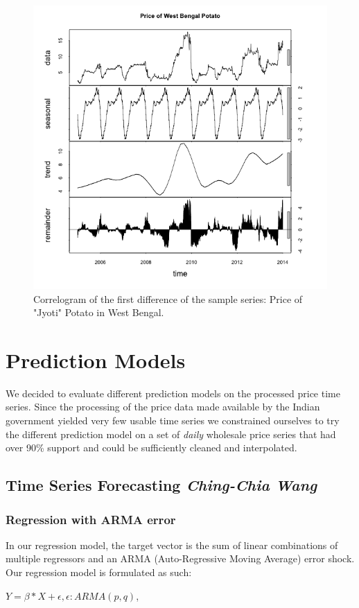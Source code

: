 \begin{figure}
    \centering
    \includegraphics[width=.7\textwidth]{./img/seasonal.png}
    \caption{Correlogram of the first difference of the sample series: Price of "Jyoti" Potato in West Bengal.}
\end{figure}


\section*{Prediction Models}
We decided to evaluate different prediction models on the processed price time series. Since the processing of the price data made available by the Indian government yielded very few usable time series we constrained ourselves to try the different prediction model on a set of \emph{daily} wholesale price series that had over 90\% support and could be sufficiently cleaned and interpolated.

\subsection*{Time Series Forecasting \footnotesize\textit{Ching-Chia Wang}}

\subsubsection*{Regression with ARMA error}
In our regression model, the target vector is the sum of linear combinations of multiple regressors and an ARMA (Auto-Regressive Moving Average) error shock. Our regression model is formulated as such:

$Y = \beta * X + \epsilon,   \epsilon: ARMA(p,q)$,


